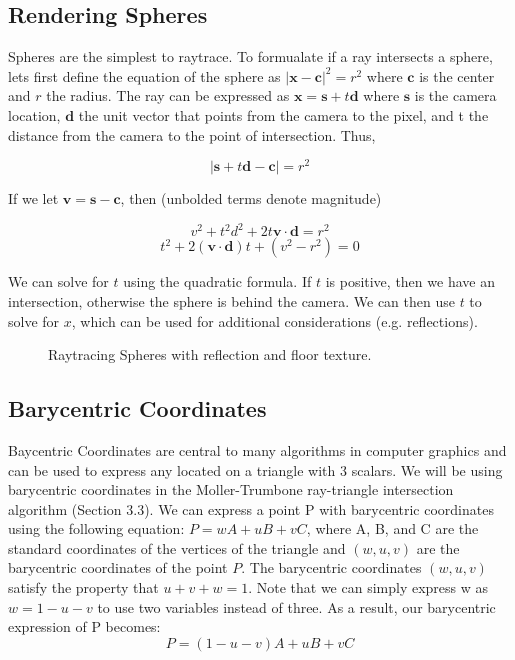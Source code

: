 \documentclass{article}
\let\vec\mathbf
\begin{document}
\subsection{Rendering Spheres}
Spheres are the simplest to raytrace. To formualate if a ray intersects a sphere, lets first define the equation of the sphere as $|\vec{x} - \vec{c}|^2 = r^2$ where $\vec{c}$ is the center and $r$ the radius. The ray can be expressed as $\vec{x} = \vec{s} + t\vec{d}$ where $\vec{s}$ is the camera location,  $\vec{d}$ the unit vector that points from the camera to the pixel, and t the distance from the camera to the point of intersection. Thus,

$$ |\vec{s}+t\vec{d}-\vec{c}| = r^2$$

If we let $\vec{v} = \vec{s} - \vec{c}$, then (unbolded terms denote magnitude)

$$v^2 + t^2d^2 + 2t\vec{v}\cdot\vec{d} = r^2$$
$$t^2 + 2(\vec{v}\cdot\vec{d})t + (v^2-r^2) = 0$$

We can solve for $t$ using the quadratic formula. If $t$ is positive, then we have an intersection, otherwise the sphere is behind the camera. We can then use $t$ to solve for $x$, which can be used for additional considerations (e.g. reflections).

\begin{figure}[!htbp]
 \centering
 \caption{Raytracing Spheres with reflection and floor texture.}%
 \label{fig:example}%
\end{figure}

\subsection{Barycentric Coordinates}
Baycentric Coordinates are central to many algorithms in computer graphics and can be used to express any located on a triangle with 3 scalars. We will be using barycentric coordinates in the Moller-Trumbone ray-triangle intersection algorithm (Section 3.3). We can express a point P with barycentric coordinates using the following equation: $P = wA + uB + vC$, where A, B, and C are the standard coordinates of the vertices of the triangle and $(w, u, v)$ are the barycentric coordinates of the point $P$. The barycentric coordinates $\left(w,u,v\right)$ satisfy the property that $u + v + w = 1$. Note that we can simply express w as $w = 1 - u - v$ to use two variables instead of three. As a result, our barycentric expression of P becomes:
\begin{equation}
    P = \left(1-u-v\right)A + uB + vC
    \label{barycentric}
\end{equation}
\end{document}

